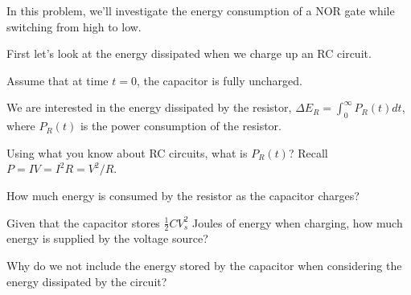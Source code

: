 
In this problem, we'll investigate the energy consumption of a NOR gate while switching from high to low.

First let's look at the energy dissipated when we charge up an RC circuit.



Assume that at time $t = 0$, the capacitor is fully uncharged.

\begin{enumerate}

\qitem We are interested in the energy dissipated by the resistor, $\Delta E_R = \int_0^\infty P_R(t) dt$, where $P_R(t)$ is the power consumption of the resistor.

Using what you know about RC circuits, what is $P_R(t)$? Recall $P = IV = I^2R = V^2 / R$.




\qitem How much energy is consumed by the resistor as the capacitor charges?



\qitem Given that the capacitor stores $\frac{1}{2}CV_s^2$ Joules of energy when charging, how much energy is supplied by the voltage source?

Why do we not include the energy stored by the capacitor when considering the energy dissipated by the circuit?

\end{enumerate}


